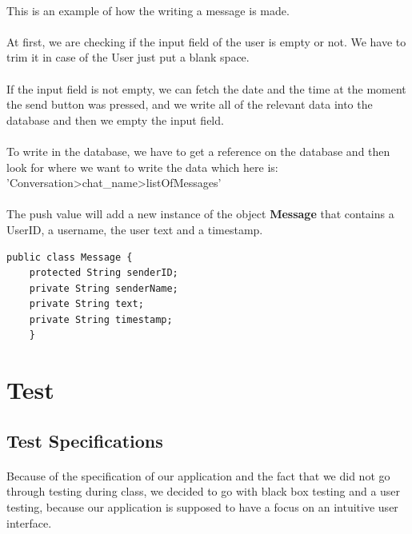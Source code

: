 \documentclass[paper=a4, fontsize=12pt,DIV=14]{scrartcl}    %
\begin{document}
        	\paragraph{} This is an example of how the writing a message is made. 
			\paragraph{}At first, we are checking if the input field of the user is empty or not. We have to trim it in case of the User just put a blank space. 
			\paragraph{}If the input field is not empty, we can fetch the date and the time at the moment the send button was pressed, and we write all of the relevant data into the database and then we empty the input field.
			\paragraph{}To write in the database, we have to get a reference on the database and then look for where we want to write the data which here is: 'Conversation\/>chat\_name>\/listOfMessages'
			\paragraph{}The push value will add a new instance of the object \textbf{Message} that contains a UserID, a username, the user text and a timestamp.

			\begin{lstlisting}
public class Message {
    protected String senderID;
    private String senderName;
    private String text;
    private String timestamp;
    }

        	\end{lstlisting}





    \newpage
        \section{Test}
        	\subsection{Test Specifications}
        		\paragraph{}Because of the specification of our application and the fact that we did not go through testing during class, we decided to go with black box testing and a user testing, because our application is supposed to have a focus on an intuitive user interface.
\end{document}
